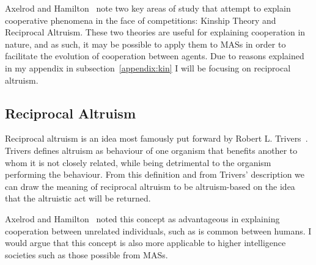 \documentclass[]{final_report}
\begin{document}
Axelrod and Hamilton~\cite{evolution_of_cooperation} note two key areas of study that attempt to explain cooperative phenomena in the face of competitions: Kinship Theory and Reciprocal Altruism. These two theories are useful for explaining cooperation in nature, and as such, it may be possible to apply them to MASs in order to facilitate the evolution of cooperation between agents. Due to reasons explained in my appendix in subsection~\ref{appendix:kin} I will be focusing on reciprocal altruism.

\subsection{Reciprocal Altruism}
Reciprocal altruism is an idea most famously put forward by Robert L. Trivers~\cite{trivers1971evolution}. Trivers defines altruism as behaviour of one organism that benefits another to whom it is not closely related, while being detrimental to the organism performing the behaviour. From this definition and from Trivers' description we can draw the meaning of reciprocal altruism to be altruism-based on the idea that the altruistic act will be returned.\par
Axelrod and Hamilton~\cite{evolution_of_cooperation} noted this concept as advantageous in explaining cooperation between unrelated individuals, such as is common between humans. I would argue that this concept is also more applicable to higher intelligence societies such as those possible from MASs.
\end{document}
